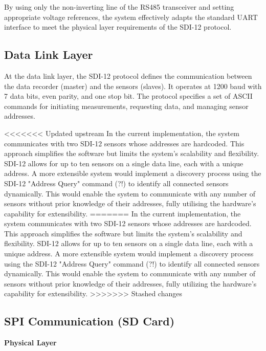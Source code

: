 By using only the non-inverting line of the RS485 transceiver and setting appropriate voltage references, 
the system effectively adapts the standard UART interface to meet the physical layer requirements of the SDI-12 protocol.

\subsection{Data Link Layer}

At the data link layer, the SDI-12 protocol defines the communication between the data recorder 
(master) and the sensors (slaves). It operates at 1200 baud with 7 data bits, even parity, and one 
stop bit. The protocol specifies a set of ASCII commands for initiating measurements, requesting 
data, and managing sensor addresses.

<<<<<<< Updated upstream
In the current implementation, the system communicates with two SDI-12 sensors whose addresses are hardcoded. This approach simplifies the software but limits the system's scalability and flexibility. SDI-12 allows for up to ten sensors on a single data line, each with a unique address. A more extensible system would implement a discovery process using the SDI-12 "Address Query" command (?!) to identify all connected sensors dynamically. This would enable the system to communicate with any number of sensors without prior knowledge of their addresses, fully utilising the hardware's capability for extensibility.
=======
In the current implementation, the system communicates with two SDI-12 sensors whose addresses are 
hardcoded. This approach simplifies the software but limits the system's scalability and flexibility. 
SDI-12 allows for up to ten sensors on a single data line, each with a unique address. A more extensible 
system would implement a discovery process using the SDI-12 "Address Query" command (?!) to identify 
all connected sensors dynamically. This would enable the system to communicate with any number of sensors 
without prior knowledge of their addresses, fully utilizing the hardware's capability for extensibility.
>>>>>>> Stashed changes

\subsection{SPI Communication (SD Card)}
\textbf{Physical Layer}

